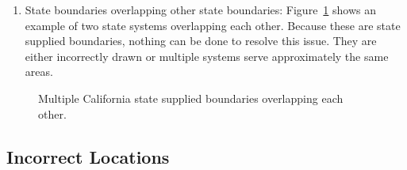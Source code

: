 \documentclass[
  letterpaper,
  DIV=11,
  numbers=noendperiod,
  oneside]{scrartcl}
\providecommand{\tightlist}{%
  \setlength{\itemsep}{0pt}\setlength{\parskip}{0pt}}\usepackage{longtable,booktabs,array}
\begin{document}
\begin{enumerate}
\def\labelenumi{\arabic{enumi}.}
\setcounter{enumi}{1}
\tightlist
\item
  State boundaries overlapping other state boundaries:
  Figure~\ref{fig-overlap2} shows an example of two state systems
  overlapping each other. Because these are state supplied boundaries,
  nothing can be done to resolve this issue. They are either incorrectly
  drawn or multiple systems serve approximately the same areas.
\end{enumerate}

\begin{figure}


\caption{\label{fig-overlap2}Multiple California state supplied
boundaries overlapping each other.}

\end{figure}%

\subsection{Incorrect Locations}\label{incorrect-locations}
\end{document}
